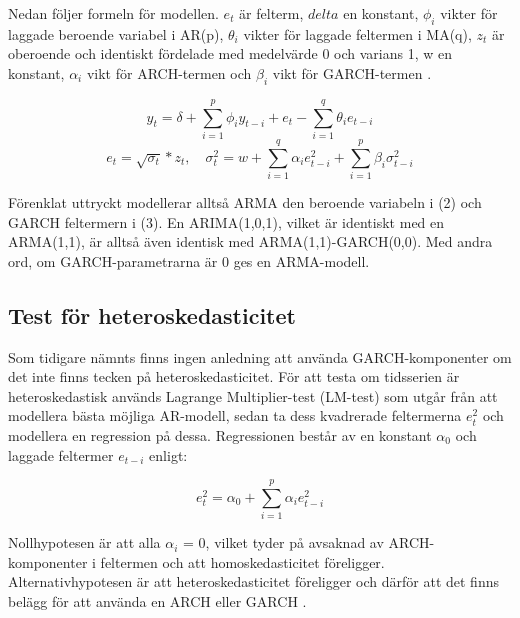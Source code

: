 \documentclass[11pt]{article}
\begin{document}
Nedan följer formeln för modellen. \(e_t\) är felterm, \(delta\) en konstant, \(\phi_i\) vikter för laggade beroende variabel i AR(p), \(\theta_i\) vikter för laggade feltermen i MA(q), \(z_t\) är oberoende och identiskt fördelade med medelvärde 0 och varians 1, w en konstant, \(\alpha_i\) vikt för ARCH-termen och \(\beta_i\) vikt för GARCH-termen \parencite{bollerslev1986generalized, montgomery2015forecasting}.

\begin{equation}
    y_t = \delta + \sum_{i=1}^{p}\phi_iy_{t-i}  +e_t - \sum_{i=1}^{q}\theta_i e_{t-i} 
\end{equation}
\begin{equation}
    e_t=\sqrt{\sigma_t}*z_t,\quad \sigma^2_t=w + \sum_{i=1}^{q}\alpha_i e^2_{t-i} + \sum_{i=1}^{p}\beta_i \sigma^2_{t-i}
\end{equation}

Förenklat uttryckt modellerar alltså ARMA den beroende variabeln i (2) och GARCH feltermern i (3). En ARIMA(1,0,1), vilket är identiskt med en ARMA(1,1), är alltså även identisk med ARMA(1,1)-GARCH(0,0). Med andra ord, om GARCH-parametrarna är 0 ges en ARMA-modell.

\subsection{Test för heteroskedasticitet}

Som tidigare nämnts finns ingen anledning att använda GARCH-komponenter om det inte finns tecken på heteroskedasticitet. För att testa om tidsserien är heteroskedastisk används Lagrange Multiplier-test (LM-test) som utgår från att modellera bästa möjliga AR-modell, sedan ta dess kvadrerade feltermerna \(e_t^2\) och modellera en regression på dessa. Regressionen består av en konstant \(\alpha_0\) och laggade feltermer \(e_{t-i}\) enligt:

\begin{equation}
    e_t^2=\alpha_0+\sum_{i=1}^{p}\alpha_ie_{t-i}^2
\end{equation}

Nollhypotesen är att alla \(\alpha_i\) = 0, vilket tyder på avsaknad av ARCH-komponenter i feltermen och att homoskedasticitet föreligger. Alternativhypotesen är att heteroskedasticitet föreligger och därför att det finns belägg för att använda en ARCH eller GARCH \parencite{engle1982autoregressive}. 
\end{document}
